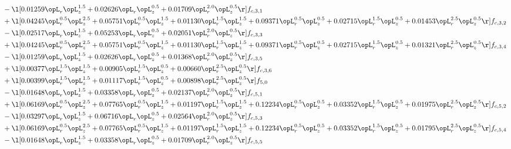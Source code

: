 \begin{alignat}{2}
& - \l[  0.01259 \opL_r \opL_z^{1.5} +  0.02626 \opL_r \opL_z^{0.5} +  0.01709 \opL_r^{2.0} \opL_z^{0.5}  \r] f_{c,3,1} \nonumber \\ 
& + \l[  0.04245 \opL_r^{0.5} \opL_z^{2.5} +  0.05751 \opL_r^{0.5} \opL_z^{1.5} +  0.01130 \opL_r^{1.5} \opL_z^{1.5} +  0.09371 \opL_r^{0.5} \opL_z^{0.5} +  0.02715 \opL_r^{1.5} \opL_z^{0.5} +  0.01453 \opL_r^{2.5} \opL_z^{0.5}  \r] f_{c,3,2} \nonumber \\ 
& - \l[  0.02517 \opL_r \opL_z^{1.5} +  0.05253 \opL_r \opL_z^{0.5} +  0.02051 \opL_r^{2.0} \opL_z^{0.5}  \r] f_{c,3,3} \nonumber \\ 
& + \l[  0.04245 \opL_r^{0.5} \opL_z^{2.5} +  0.05751 \opL_r^{0.5} \opL_z^{1.5} +  0.01130 \opL_r^{1.5} \opL_z^{1.5} +  0.09371 \opL_r^{0.5} \opL_z^{0.5} +  0.02715 \opL_r^{1.5} \opL_z^{0.5} +  0.01321 \opL_r^{2.5} \opL_z^{0.5}  \r] f_{c,3,4} \nonumber \\ 
& - \l[  0.01259 \opL_r \opL_z^{1.5} +  0.02626 \opL_r \opL_z^{0.5} +  0.01368 \opL_r^{2.0} \opL_z^{0.5}  \r] f_{c,3,5} \nonumber \\ 
& + \l[  0.00377 \opL_r^{1.5} \opL_z^{1.5} +  0.00905 \opL_r^{1.5} \opL_z^{0.5} +  0.00660 \opL_r^{2.5} \opL_z^{0.5}  \r] f_{c,3,6} \nonumber \\ 
& + \l[  0.00399 \opL_r^{1.5} \opL_z^{1.5} +  0.01117 \opL_r^{1.5} \opL_z^{0.5} +  0.00898 \opL_r^{2.5} \opL_z^{0.5}  \r] f_{5,0} \nonumber \\ 
& - \l[  0.01648 \opL_r \opL_z^{1.5} +  0.03358 \opL_r \opL_z^{0.5} +  0.02137 \opL_r^{2.0} \opL_z^{0.5}  \r] f_{c,5,1} \nonumber \\ 
& + \l[  0.06169 \opL_r^{0.5} \opL_z^{2.5} +  0.07765 \opL_r^{0.5} \opL_z^{1.5} +  0.01197 \opL_r^{1.5} \opL_z^{1.5} +  0.12234 \opL_r^{0.5} \opL_z^{0.5} +  0.03352 \opL_r^{1.5} \opL_z^{0.5} +  0.01975 \opL_r^{2.5} \opL_z^{0.5}  \r] f_{c,5,2} \nonumber \\ 
& - \l[  0.03297 \opL_r \opL_z^{1.5} +  0.06716 \opL_r \opL_z^{0.5} +  0.02564 \opL_r^{2.0} \opL_z^{0.5}  \r] f_{c,5,3} \nonumber \\ 
& + \l[  0.06169 \opL_r^{0.5} \opL_z^{2.5} +  0.07765 \opL_r^{0.5} \opL_z^{1.5} +  0.01197 \opL_r^{1.5} \opL_z^{1.5} +  0.12234 \opL_r^{0.5} \opL_z^{0.5} +  0.03352 \opL_r^{1.5} \opL_z^{0.5} +  0.01795 \opL_r^{2.5} \opL_z^{0.5}  \r] f_{c,5,4} \nonumber \\ 
& - \l[  0.01648 \opL_r \opL_z^{1.5} +  0.03358 \opL_r \opL_z^{0.5} +  0.01709 \opL_r^{2.0} \opL_z^{0.5}  \r] f_{c,5,5} \nonumber \\ 

\end{alignat}
